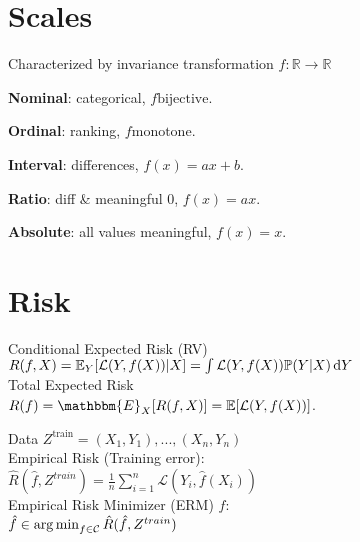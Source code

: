 




\section*{Scales}

Characterized by invariance transformation $f: \mathbb{R} \rightarrow \mathbb{R}$

\textbf{Nominal}: categorical, $f \textrm{bijective}$.

\textbf{Ordinal}: ranking, $f \textrm{monotone}$.

\textbf{Interval}: differences, $f(x) = ax + b$.

\textbf{Ratio}: diff \& meaningful 0, $f(x) = ax$.

\textbf{Absolute}: all values meaningful, $f(x) = x$. 

\section*{Risk}
Conditional Expected Risk (RV)\\
$R(f, X) = \mathbb{E}_Y[\mathcal{L}(Y,f(X))|X] = \int \mathcal{L}(Y,f(X))\mathbb{P}(Y|X)\operatorname{d\!} Y$\\
Total Expected Risk\\
$R(f) = \mathbbm{E}_{X}[R(f,X)] = \E[\mathcal{L}(Y, f(X))]$.

Data $Z^\text{train}={(X_1,Y_1),...,(X_n,Y_n)}$ \\
Empirical Risk (Training error):\\
$\hat{R}(\hat{f}, Z^{train}) = \frac{1}{n} \sum_{i=1}^n \mathcal{L}(Y_i, \hat{f}(X_i))$\\
Empirical Risk Minimizer (ERM) $\hat{f}$:\\
$\hat{f} \in \operatorname*{arg\,min}_{f \in \mathcal{C}} \hat{R}(\hat{f}, Z^{train})$\\

